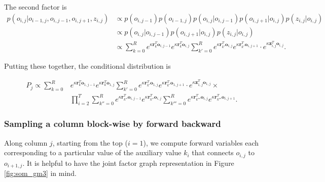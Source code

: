 \documentclass[11pt]{article}
\begin{document}
\noindent The second factor is
%
\begin{align*}
p(o_{i,j}|o_{i-1,j},o_{i,j-1},o_{i,j+1},z_{i,j}) &\propto p(o_{i,j-1}) p(o_{i-1,j}) p(o_{i,j}|o_{i,j-1})p(o_{i,j+1}|o_{i,j})p(z_{i,j}|o_{i,j}) \\
&\propto p(o_{i,j}|o_{i,j-1})p(o_{i,j+1}|o_{i,j})p(z_{i,j}|o_{i,j}) \\
&\propto \sum_{k=0}^R e^{\kappa \mathbf{r}_k^T \mathbf{o}_{i,j-1}} e^{\kappa \mathbf{r}_k^T \mathbf{o}_{i,j}}
\sum_{k'=0}^R e^{\kappa \mathbf{r}_{k'}^T \mathbf{o}_{i,j}} e^{\kappa \mathbf{r}_{k'}^T \mathbf{o}_{i,j+1}}
\cdot e^{\kappa \mathbf{z}_{i,j}^T\mathbf{o}_{i,j} }.
\end{align*}

\noindent Putting these together, the conditional distribution is

\begin{align*}
P_j \propto \sum_{k=0}^R &e^{\kappa \mathbf{r}_k^T \mathbf{o}_{1,j-1}} e^{\kappa \mathbf{r}_k^T \mathbf{o}_{1,j}}
\sum_{k'=0}^R e^{\kappa \mathbf{r}_{k'}^T \mathbf{o}_{1,j}} e^{\kappa \mathbf{r}_{k'}^T \mathbf{o}_{1,j+1}}
\cdot e^{\kappa \mathbf{z}_{1,j}^T\mathbf{o}_{1,j} } \times \\
&\prod_{i=2}^T \sum_{k''=0}^R e^{\kappa \mathbf{r}_{k''}^T\mathbf{o}_{i,j-1}} e^{\kappa \mathbf{r}_{k''}^T\mathbf{o}_{i,j}}
\sum_{k'''=0}^R e^{\kappa \mathbf{r}_{k'''}^T\mathbf{o}_{i,j}} e^{\kappa \mathbf{r}_{k'''}^T\mathbf{o}_{i,j+1}}.
\end{align*}

\subsubsection*{Sampling a column block-wise by forward backward}

Along column $j$, starting from the top ($i=1$), we compute forward variables each corresponding to a particular value of the auxiliary value $k_i$ that connects $o_{i,j}$ to $o_{i+1,j}$. It is helpful to have the joint factor graph representation in Figure \ref{fig:som_gm3} in mind.
\end{document}
